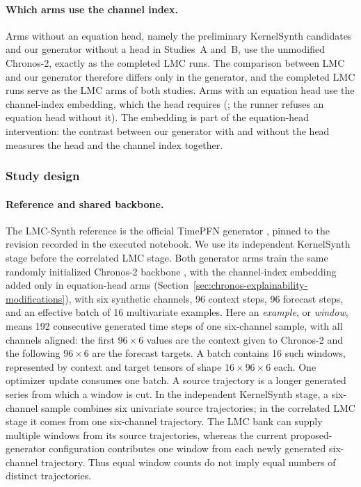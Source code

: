 \paragraph{Which arms use the channel index.}
Arms without an equation head, namely the preliminary KernelSynth candidates
and our generator without a head in Studies~A and~B, use the unmodified
Chronos-2, exactly as the completed LMC runs. The comparison between LMC and
our generator therefore differs only in the generator, and the completed LMC
runs serve as the LMC arms of both studies. Arms with an equation head use the
channel-index embedding, which the head requires
(; the runner refuses
an equation head without it). The embedding is part of the equation-head
intervention: the contrast between our generator with and without the head
measures the head and the channel index together.

\subsubsection{Study design}

\paragraph{Reference and shared backbone.}
The LMC-Synth reference is the official TimePFN generator
\citep{taga2025timepfn}, pinned to the revision recorded in the executed
notebook. We use its
independent KernelSynth stage before the correlated LMC stage. Both generator
arms train the same randomly initialized Chronos-2 backbone
\citep{ansari2025chronos2}, with the channel-index embedding added only in
equation-head arms (Section~\ref{sec:chronos-explainability-modifications}),
with six synthetic channels, 96 context steps,
96 forecast steps, and an effective batch of 16 multivariate examples.
Here an \emph{example}, or \emph{window}, means 192 consecutive generated time
steps of one six-channel sample, with all channels aligned: the first
$96\times6$ values are the context given to Chronos-2 and the following
$96\times6$ are the forecast targets. A batch contains 16 such windows,
represented by context and target tensors of shape $16\times96\times6$ each.
One optimizer update consumes one batch. A source trajectory is a longer
generated series from which a window is cut. In the independent KernelSynth
stage, a six-channel sample combines six univariate source trajectories; in
the correlated LMC stage it comes from one six-channel trajectory. The LMC
bank can supply multiple windows from its source trajectories, whereas the
current proposed-generator configuration contributes one window from each
newly generated six-channel trajectory. Thus equal window counts do not imply
equal numbers of distinct trajectories.

